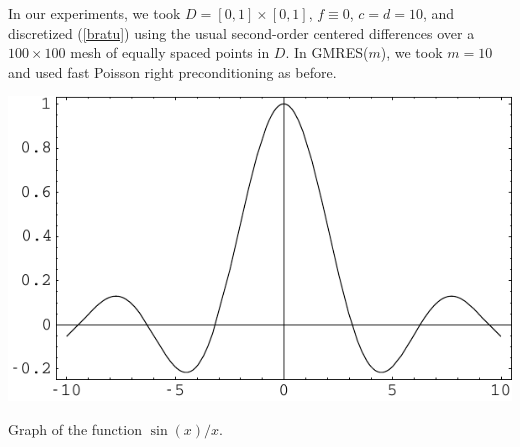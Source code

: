 \documentclass[myposter,portrait]{sciposter}
\begin{document}
\begin{multicols*}{3}
\def\gmres{{GMRES}} 
\def\gmresm{{\rm GMRES($m$)}} 

In our experiments, we took $D = [0,1]\times[0,1]$, $f \equiv0$, 
$c=d=10$, and discretized (\ref{bratu}) using the usual second-order 
centered differences over a $100\times100$ mesh of equally 
spaced points in $D$. In \gmres($m$), we took $m=10$ and used fast  
Poisson right preconditioning as before.

\bigskip 
\includegraphics[width=\columnwidth]{fig}
\caption{Graph of the function $\sin(x)/x$.} 
 




\end{multicols*}
\end{document}
